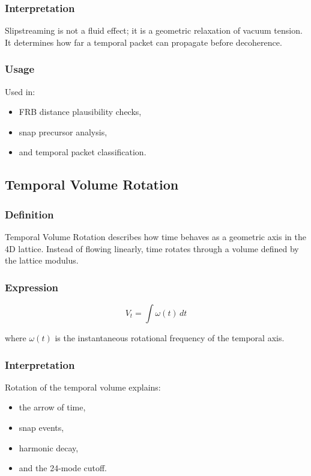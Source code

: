 \documentclass[12pt,oneside]{book}
\begin{document}
\subsubsection{Interpretation}
Slipstreaming is not a fluid effect; it is a geometric relaxation of vacuum tension.  
It determines how far a temporal packet can propagate before decoherence.

\subsubsection{Usage}
Used in:
\begin{itemize}
    \item FRB distance plausibility checks,
    \item snap precursor analysis,
    \item and temporal packet classification.
\end{itemize}


\subsection{Temporal Volume Rotation}

\subsubsection{Definition}
Temporal Volume Rotation describes how time behaves as a geometric axis in the 4D lattice.
Instead of flowing linearly, time rotates through a volume defined by the lattice modulus.

\subsubsection{Expression}


\[
V_t = \int \omega(t) \, dt
\]


where $\omega(t)$ is the instantaneous rotational frequency of the temporal axis.

\subsubsection{Interpretation}
Rotation of the temporal volume explains:
\begin{itemize}
    \item the arrow of time,
    \item snap events,
    \item harmonic decay,
    \item and the 24-mode cutoff.
\end{itemize}
\end{document}

